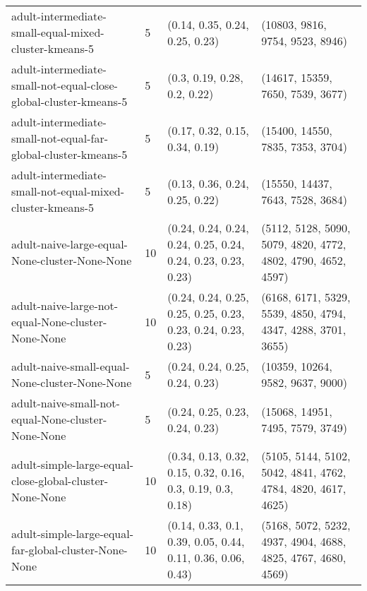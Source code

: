 \begin{longtable}{llll}
                                  adult-intermediate-small-equal-mixed-cluster-kmeans-5 &              5 &                               (0.14, 0.35, 0.24, 0.25, 0.23) &                              (10803, 9816, 9754, 9523, 8946) \\
                       adult-intermediate-small-not-equal-close-global-cluster-kmeans-5 &              5 &                                 (0.3, 0.19, 0.28, 0.2, 0.22) &                             (14617, 15359, 7650, 7539, 3677) \\
                         adult-intermediate-small-not-equal-far-global-cluster-kmeans-5 &              5 &                               (0.17, 0.32, 0.15, 0.34, 0.19) &                             (15400, 14550, 7835, 7353, 3704) \\
                              adult-intermediate-small-not-equal-mixed-cluster-kmeans-5 &              5 &                               (0.13, 0.36, 0.24, 0.25, 0.22) &                             (15550, 14437, 7643, 7528, 3684) \\
                                         adult-naive-large-equal-None-cluster-None-None &             10 & (0.24, 0.24, 0.24, 0.24, 0.25, 0.24, 0.24, 0.23, 0.23, 0.23) & (5112, 5128, 5090, 5079, 4820, 4772, 4802, 4790, 4652, 4597) \\
                                     adult-naive-large-not-equal-None-cluster-None-None &             10 & (0.24, 0.24, 0.25, 0.25, 0.25, 0.23, 0.23, 0.24, 0.23, 0.23) & (6168, 6171, 5329, 5539, 4850, 4794, 4347, 4288, 3701, 3655) \\
                                         adult-naive-small-equal-None-cluster-None-None &              5 &                               (0.24, 0.24, 0.25, 0.24, 0.23) &                             (10359, 10264, 9582, 9637, 9000) \\
                                     adult-naive-small-not-equal-None-cluster-None-None &              5 &                               (0.24, 0.25, 0.23, 0.24, 0.23) &                             (15068, 14951, 7495, 7579, 3749) \\
                                adult-simple-large-equal-close-global-cluster-None-None &             10 &   (0.34, 0.13, 0.32, 0.15, 0.32, 0.16, 0.3, 0.19, 0.3, 0.18) & (5105, 5144, 5102, 5042, 4841, 4762, 4784, 4820, 4617, 4625) \\
                                  adult-simple-large-equal-far-global-cluster-None-None &             10 &  (0.14, 0.33, 0.1, 0.39, 0.05, 0.44, 0.11, 0.36, 0.06, 0.43) & (5168, 5072, 5232, 4937, 4904, 4688, 4825, 4767, 4680, 4569) \\

\end{longtable}
